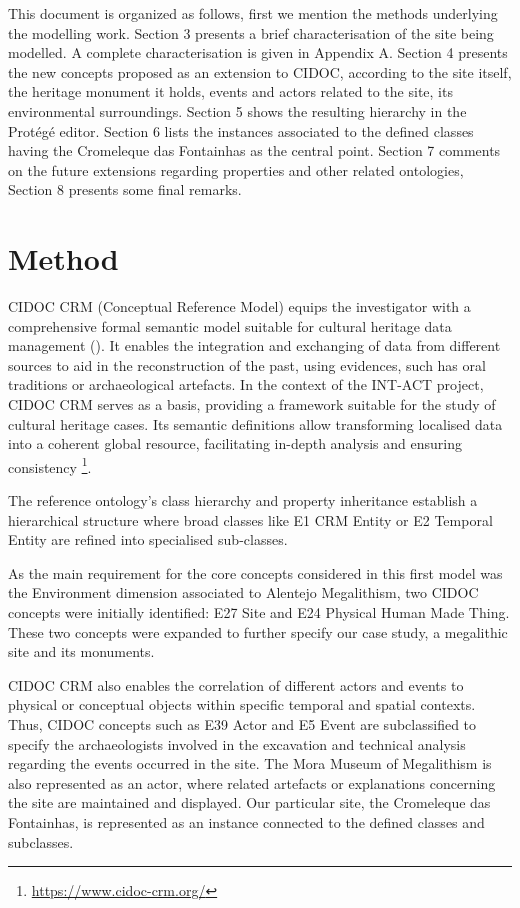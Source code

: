 \documentclass[10pt]{report}
\begin{document}
This document is organized as follows, first we mention the methods underlying the modelling work. Section 3 presents a brief characterisation of the site being modelled. A complete characterisation is given in Appendix A. Section 4 presents the new concepts proposed as an extension to CIDOC, according to the site itself, the heritage monument it holds, events and actors related to the site, its environmental surroundings. Section 5 shows the resulting hierarchy in the Protégé editor. Section 6 lists the instances associated to the defined classes having the Cromeleque das Fontainhas as the central point. Section 7 comments on the future extensions regarding properties and other related ontologies, Section 8 presents some final remarks.



\section{Method}


CIDOC CRM (Conceptual Reference Model) equips the investigator with a comprehensive formal semantic model suitable for cultural heritage data management (\cite{bruseker2017cultural}).
It enables the integration and exchanging of data from different sources to aid in the reconstruction of the past, using evidences, such has oral traditions or archaeological artefacts. In the context of the INT-ACT project, CIDOC CRM serves as a basis,  providing a framework suitable for the study of cultural heritage cases. Its  semantic definitions allow transforming localised data into a coherent global resource, facilitating in-depth analysis and ensuring consistency
\footnote{\url{https://www.cidoc-crm.org/}}.

The reference ontology's class hierarchy and property inheritance establish a hierarchical structure where broad classes like E1 CRM Entity or E2 Temporal Entity are refined into specialised sub-classes.

As the main requirement for the core concepts considered in this first model was the Environment dimension associated to Alentejo Megalithism, two CIDOC concepts were initially identified: E27 Site and E24 Physical Human Made Thing. These two concepts were expanded to further specify our case study, a megalithic site and its monuments.

CIDOC CRM also enables the correlation of different actors and events to physical or conceptual objects within specific temporal and spatial contexts.  Thus, CIDOC concepts such as E39 Actor and E5 Event are subclassified to specify the archaeologists involved in the excavation and technical analysis regarding the events occurred in the site. The Mora Museum of Megalithism is also represented as an actor, where related artefacts or explanations concerning the site are maintained and displayed. Our particular site, the Cromeleque das Fontainhas, is represented as an instance connected to the defined classes and subclasses.   
\end{document}
